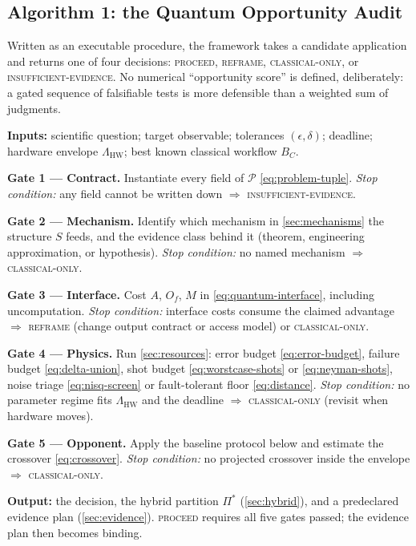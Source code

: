 \subsection{Algorithm 1: the Quantum Opportunity Audit}\label{sec:algorithm}

Written as an executable procedure, the framework takes a candidate application and returns one of four decisions: \textsc{proceed}, \textsc{reframe}, \textsc{classical-only}, or \textsc{insufficient-evidence}. No numerical ``opportunity score'' is defined, deliberately: a gated sequence of falsifiable tests is more defensible than a weighted sum of judgments.

\begin{thesisbox}
\textbf{Inputs:} scientific question; target observable; tolerances $(\epsilon,\delta)$; deadline; hardware envelope $\Lambda_{\mathrm{HW}}$; best known classical workflow $B_C$.

\textbf{Gate 1 --- Contract.} Instantiate every field of $\mathcal{P}$ \eqref{eq:problem-tuple}. \emph{Stop condition:} any field cannot be written down $\Rightarrow$ \textsc{insufficient-evidence}.

\textbf{Gate 2 --- Mechanism.} Identify which mechanism in \cref{sec:mechanisms} the structure $S$ feeds, and the evidence class behind it (theorem, engineering approximation, or hypothesis). \emph{Stop condition:} no named mechanism $\Rightarrow$ \textsc{classical-only}.

\textbf{Gate 3 --- Interface.} Cost $A$, $O_f$, $M$ in \cref{eq:quantum-interface}, including uncomputation. \emph{Stop condition:} interface costs consume the claimed advantage $\Rightarrow$ \textsc{reframe} (change output contract or access model) or \textsc{classical-only}.

\textbf{Gate 4 --- Physics.} Run \cref{sec:resources}: error budget \eqref{eq:error-budget}, failure budget \eqref{eq:delta-union}, shot budget \eqref{eq:worstcase-shots} or \eqref{eq:neyman-shots}, noise triage \eqref{eq:nisq-screen} or fault-tolerant floor \eqref{eq:distance}. \emph{Stop condition:} no parameter regime fits $\Lambda_{\mathrm{HW}}$ and the deadline $\Rightarrow$ \textsc{classical-only} (revisit when hardware moves).

\textbf{Gate 5 --- Opponent.} Apply the baseline protocol below and estimate the crossover \eqref{eq:crossover}. \emph{Stop condition:} no projected crossover inside the envelope $\Rightarrow$ \textsc{classical-only}.

\textbf{Output:} the decision, the hybrid partition $\Pi^{*}$ (\cref{sec:hybrid}), and a predeclared evidence plan (\cref{sec:evidence}). \textsc{proceed} requires all five gates passed; the evidence plan then becomes binding.
\end{thesisbox}


